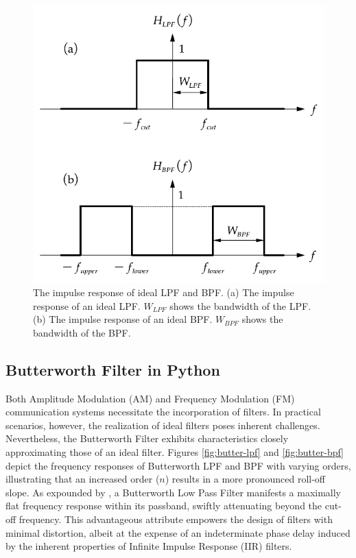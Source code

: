 \documentclass[../ECE459FinalProjectReport.tex]{subfiles}
\begin{document}
\begin{figure}[b]
    \centering
    \includegraphics[scale=0.6]{plots/ideal-filters.pdf}
    \caption{The impulse response of ideal LPF and BPF. (a) The impulse response of an ideal LPF. $W_{LPF}$ shows the bandwidth of the LPF. (b) The impulse response of an ideal BPF. $W_{BPF}$ shows the bandwidth of the BPF.}
    \label{fig:ideal-filter}
\end{figure}

\subsection{Butterworth Filter in Python}

Both Amplitude Modulation (AM) and Frequency Modulation (FM) communication systems necessitate the incorporation of filters. In practical scenarios, however, the realization of ideal filters poses inherent challenges. Nevertheless, the Butterworth Filter exhibits characteristics closely approximating those of an ideal filter. Figures \ref{fig:butter-lpf} and \ref{fig:butter-bpf} depict the frequency responses of Butterworth LPF and BPF with varying orders, illustrating that an increased order ($n$) results in a more pronounced roll-off slope. As expounded by \cite{storrButterworthFilterDesign2013, kudekiAnalogSignalsSystems2009}, a Butterworth Low Pass Filter manifests a maximally flat frequency response within its passband, swiftly attenuating beyond the cut-off frequency. This advantageous attribute empowers the design of filters with minimal distortion, albeit at the expense of an indeterminate phase delay induced by the inherent properties of Infinite Impulse Response (IIR) filters.
\end{document}
